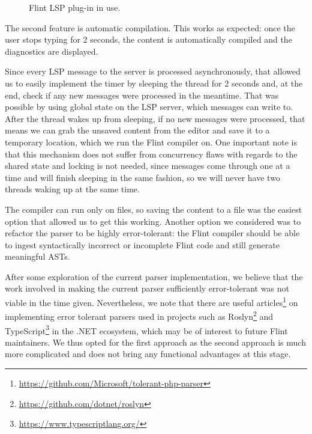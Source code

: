 \begin{figure}[htbp]
\centering
{}
\caption{Flint LSP plug-in in use.}
\label{lsp-use}
\end{figure}

The second feature is automatic compilation. This works as expected: once the user stops typing for 2 seconds, the content is automatically compiled and the diagnostics are displayed.

Since every LSP message to the server is processed asynchronously, that allowed us to easily implement the timer by sleeping the thread for 2 seconds and, at the end, check if any new messages were processed in the meantime. That was possible by using global state on the LSP server, which messages can write to. After the thread wakes up from sleeping, if no new messages were processed, that means we can grab the unsaved content from the editor and save it to a temporary location, which we run the Flint compiler on. One important note is that this mechanism does not suffer from concurrency flaws with regards to the shared state and locking is not needed, since messages come through one at a time and will finish sleeping in the same fashion, so we will never have two threads waking up at the same time.

The compiler can run only on files, so saving the content to a file was the easiest option that allowed us to get this working. Another option we considered was to refactor the parser to be highly error-tolerant: the Flint compiler should be able to ingest syntactically incorrect or incomplete Flint code and still generate meaningful ASTs. 

After some exploration of the current parser implementation, we believe that the work involved in making the current parser sufficiently error-tolerant was not viable in the time given. Nevertheless, we note that there are useful articles\footnote{\url{https://github.com/Microsoft/tolerant-php-parser}} on implementing error tolerant parsers used in projects such as Roslyn\footnote{\url{https://github.com/dotnet/roslyn}} and TypeScript\footnote{\url{https://www.typescriptlang.org/}} in the .NET ecosystem, which may be of interest to future Flint maintainers. We thus opted for the first approach as the second approach is much more complicated and does not bring any functional advantages at this stage.
